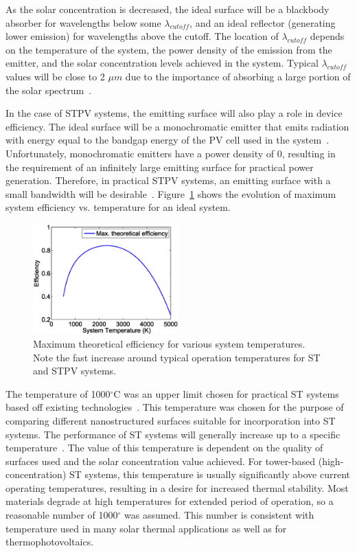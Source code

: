 \documentclass[review]{elsarticle}
\begin{document}
As the solar concentration is decreased, the ideal surface will be a blackbody absorber for wavelengths below 
some $\lambda_{cutoff}$, and an ideal reflector (generating lower emission) for wavelengths above the cutoff.  The 
location of $\lambda_{cutoff}$
depends on the temperature of the system, the power density of the emission from the emitter, and the solar concentration 
levels achieved in the system.  Typical $\lambda_{cutoff}$ values will be close to 2 $\mu m$ due to the importance of absorbing a 
large portion of the solar spectrum~\cite{RF_OptExp_2009}.
 
In the case of STPV systems, the emitting 
surface will also play a role in device efficiency.  The ideal
surface will be a monochromatic emitter that emits radiation with energy equal to the 
bandgap energy of the PV cell used in the system~\cite{L_AIP_2007}.  Unfortunately, monochromatic 
emitters have a power density of 0, resulting in the requirement of an infinitely large 
emitting surface for practical power generation.  Therefore, in practical STPV systems, an 
emitting surface with a small bandwidth will be desirable~\cite{RF_OptExp_2009}.  
Figure~\ref{Ideal} 
shows the evolution of maximum system efficiency vs. temperature for an ideal system.
\begin{figure}[ht]
\begin{center}
        \includegraphics[width=0.5\textwidth]{ideal_STPV_eff}
        \caption{\label{Ideal} Maximum theoretical efficiency for various system temperatures.  Note the fast increase
around typical operation temperatures for ST and STPV systems.}
\end{center}
\end{figure}

The temperature of 1000$^\circ$C was an upper limit chosen for practical ST systems based off existing 
technologies~\cite{RKR_RenEnRev_2013, g2}.  This temperature was chosen for the purpose of comparing different nanostructured 
surfaces suitable for incorporation into ST systems.  The performance of ST systems will generally 
increase up to a specific temperature~\cite{MS_EnConvMan_2012}.  The value of this temperature is dependent on the 
quality of surfaces used and the solar concentration value achieved.  For tower-based (high-concentration) 
ST systems, this temperature is usually significantly above current operating temperatures, resulting in a 
desire for increased thermal stability. Most materials degrade at high temperatures for extended period of 
operation, so a reasonable number of 1000$^{\circ}$ was assumed. This number is consistent with temperature used in 
many solar thermal applications as well as for thermophotovoltaics.
\end{document}
